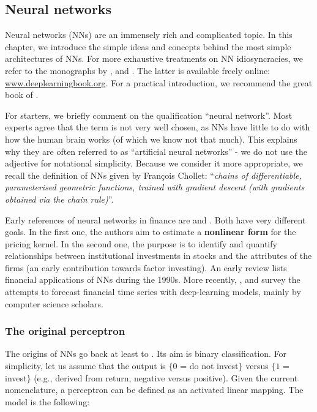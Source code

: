 \subsection{Neural networks}

Neural networks (NNs) are an immensely rich and complicated topic. In this chapter, we introduce the simple ideas and concepts behind the most simple architectures of NNs. For more exhaustive treatments on NN idiosyncracies, we refer to the monographs by \cite{haykin2009neural}, \cite{du2013neural} and \cite{goodfellow2016deep}. The latter is available freely online: \href{http://www.deeplearningbook.org}{www.deeplearningbook.org}. For a practical introduction, we recommend the great book of \cite{chollet2017deep}.

For starters, we briefly comment on the qualification ``neural network''. Most experts agree that the term is not very well chosen, as NNs have little to do with how the human brain works (of which we know not that much). This explains why they are often referred to as ``artificial neural networks'' - we do not use the adjective for notational simplicity. Because we consider it more appropriate, we recall the definition of NNs given by François Chollet: ``\textit{chains of differentiable, parameterised geometric functions, trained with gradient descent (with gradients obtained via the chain rule)}''.

Early references of neural networks in finance are \cite{bansal1993no} and \cite{eakins1998analyzing}. Both have very different goals. In the first one, the authors aim to estimate a \textbf{nonlinear form} for the pricing kernel. In the second one, the purpose is to identify and quantify relationships between institutional investments in stocks and the attributes of the firms (an early contribution towards factor investing). An early review \citep{burrell1997impact} lists financial applications of NNs during the 1990s. More recently, \cite{sezer2019financial}, \cite{jiang2020applications} and \cite{lim2020time} survey the attempts to forecast financial time series with deep-learning models, mainly by computer science scholars.

\subsubsection{The original perceptron}

The origins of NNs go back at least to \cite{rosenblatt1958perceptron}. Its aim is binary classification. For simplicity, let us assume that the output is $\{0$ = do not invest$\}$ versus $\{1$ = invest$\}$ (e.g., derived from return, negative versus positive). Given the current nomenclature, a perceptron can be defined as an activated linear mapping. The model is the following:

